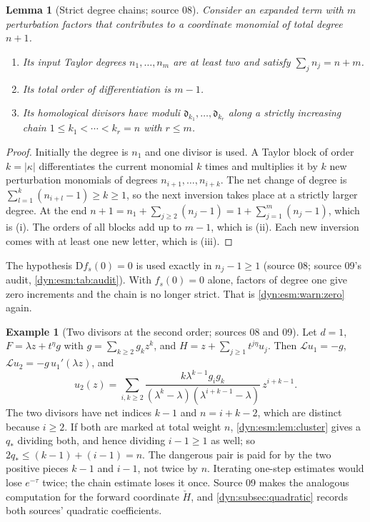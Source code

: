 \documentclass[11pt,letterpaper]{article}
\newtheorem{lemma}[lemma]{Lemma}
\theoremstyle{definition}
\newtheorem{example}[example]{Example}
\theoremstyle{remark}
\newcommand{\Li}{\mathcal L}
\numberwithin{equation}{section}
\begin{document}
\begin{lemma}[Strict degree chains; source 08]\label{dyn:esm:lem:degreechain}
Consider an expanded term with $m$ perturbation factors that contributes to
a coordinate monomial of total degree $n+1$.
\begin{enumerate}[label=(\roman*)]
\item Its input Taylor degrees $n_1,\dots,n_m$ are at least two and satisfy
$\sum_jn_j=n+m$.
\item Its total order of differentiation is $m-1$.
\item Its homological divisors have moduli
$\mathfrak d_{k_1},\dots,\mathfrak d_{k_r}$ along a strictly increasing
chain $1\le k_1<\cdots<k_r=n$ with $r\le m$.
\end{enumerate}
\end{lemma}
\begin{proof}
Initially the degree is $n_1$ and one divisor is used. A Taylor block of
order $k=|\kappa|$ differentiates the current monomial $k$ times and
multiplies it by $k$ new perturbation monomials of degrees
$n_{i+1},\dots,n_{i+k}$. The net change of degree is
$\sum_{l=1}^{k}(n_{i+l}-1)\ge k\ge1$, so the next inversion takes place at
a strictly larger degree. At the end
$n+1=n_1+\sum_{j\ge2}(n_j-1)=1+\sum_{j=1}^{m}(n_j-1)$, which is (i). The
orders of all blocks add up to $m-1$, which is (ii). Each new inversion comes
with at least one new letter, which is (iii).
\end{proof}

The hypothesis $\mathrm Df_s(0)=0$ is used exactly in $n_j-1\ge1$ (source
08; source 09's audit, \cref{dyn:esm:tab:audit}). With $f_s(0)=0$ alone,
factors of degree one give zero increments and the chain is no longer
strict. That is \cref{dyn:esm:warn:zero} again.

\begin{example}[Two divisors at the second order; sources 08 and 09]
\label{dyn:esm:ex:second}
Let $d=1$, $F=\lambda z+t^{\eta}g$ with $g=\sum_{k\ge2}g_kz^{k}$, and
$H=z+\sum_{j\ge1}t^{j\eta}u_j$. Then $\Li u_1=-g$,
$\Li u_2=-g\,u_1'(\lambda z)$, and
\begin{equation}\label{dyn:esm:eq:second}
 u_2(z)=\sum_{i,k\ge2}
 \frac{k\lambda^{k-1}g_ig_k}{(\lambda^{k}-\lambda)(\lambda^{i+k-1}-\lambda)}
 \,z^{i+k-1}.
\end{equation}
The two divisors have net indices $k-1$ and $n=i+k-2$, which are distinct
because $i\ge2$. If both are marked at total weight $n$,
\cref{dyn:esm:lem:cluster} gives a $q_*$ dividing both, and hence dividing
$i-1\ge1$ as well; so $2q_*\le(k-1)+(i-1)=n$. The dangerous pair is paid
for by the two positive pieces $k-1$ and $i-1$, not twice by $n$. Iterating
one-step estimates would lose $e^{-\tau}$ twice; the chain estimate loses it
once. Source 09 makes the analogous computation for the forward coordinate
$\check H$, and \cref{dyn:subsec:quadratic} records both sources'
quadratic coefficients.
\end{example}
\end{document}
